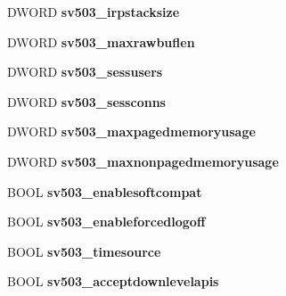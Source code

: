 \begin{DoxyCompactItemize}
D\+W\+O\+RD {\bfseries sv503\+\_\+irpstacksize}
\item 
\mbox{\label{struct___s_e_r_v_e_r___i_n_f_o__503_a95f34370f36743f257acbb25a17fd94a}} 
D\+W\+O\+RD {\bfseries sv503\+\_\+maxrawbuflen}
\item 
\mbox{\label{struct___s_e_r_v_e_r___i_n_f_o__503_ab30748f76623378cfe0ae1b96dd83b2c}} 
D\+W\+O\+RD {\bfseries sv503\+\_\+sessusers}
\item 
\mbox{\label{struct___s_e_r_v_e_r___i_n_f_o__503_af80d9e215a4a8850dc1e4a90a53ea82e}} 
D\+W\+O\+RD {\bfseries sv503\+\_\+sessconns}
\item 
\mbox{\label{struct___s_e_r_v_e_r___i_n_f_o__503_a911b05929b7b97fa9520be1f2dd401c0}} 
D\+W\+O\+RD {\bfseries sv503\+\_\+maxpagedmemoryusage}
\item 
\mbox{\label{struct___s_e_r_v_e_r___i_n_f_o__503_abaf203f94b69608e72e4980f850054d7}} 
D\+W\+O\+RD {\bfseries sv503\+\_\+maxnonpagedmemoryusage}
\item 
\mbox{\label{struct___s_e_r_v_e_r___i_n_f_o__503_a30ed77b6e53bc5150f8c02a71353ad7a}} 
B\+O\+OL {\bfseries sv503\+\_\+enablesoftcompat}
\item 
\mbox{\label{struct___s_e_r_v_e_r___i_n_f_o__503_a1f8ed304ac693109adf113af0e5e590b}} 
B\+O\+OL {\bfseries sv503\+\_\+enableforcedlogoff}
\item 
\mbox{\label{struct___s_e_r_v_e_r___i_n_f_o__503_a7eb992680f2b8dd3d07e3cd74550c338}} 
B\+O\+OL {\bfseries sv503\+\_\+timesource}
\item 
\mbox{\label{struct___s_e_r_v_e_r___i_n_f_o__503_a15f05fbe5b1ac1b12e5159278c8a9604}} 
B\+O\+OL {\bfseries sv503\+\_\+acceptdownlevelapis}
\item 
\mbox{\label{struct___s_e_r_v_e_r___i_n_f_o__503_a43d7ff95ea01ea0a3a7b91cf709f59a0}} 

\end{DoxyCompactItemize}
